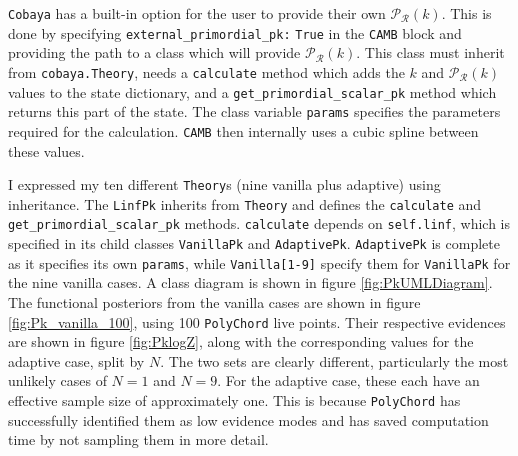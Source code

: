 \documentclass{article}
\begin{document}
\texttt{Cobaya} has a built-in option for the user to provide their own $\mathcal P_\mathcal R(k)$. This is done by specifying \texttt{external\_primordial\_pk:} \texttt{True} in the \texttt{CAMB} block and providing the path to a class which will provide $\mathcal P_\mathcal R(k)$. This class must inherit from \texttt{cobaya.Theory}, needs a \texttt{calculate} method which adds the $k$ and $\mathcal P_\mathcal R(k)$ values to the state dictionary, and a \texttt{get\_primordial\_scalar\_pk} method which returns this part of the state. The class variable \texttt{params} specifies the parameters required for the calculation. \texttt{CAMB} then internally uses a cubic spline between these values.

I expressed my ten different \texttt{Theory}s (nine vanilla plus adaptive) using inheritance. The \texttt{LinfPk} inherits from \texttt{Theory} and defines the \texttt{calculate} and \texttt{get\_primordial\_scalar\_pk} methods. \texttt{calculate} depends on \texttt{self.linf}, which is specified in its child classes \texttt{VanillaPk} and \texttt{AdaptivePk}. \texttt{AdaptivePk} is complete as it specifies its own \texttt{params}, while \texttt{Vanilla[1-9]} specify them for  \texttt{VanillaPk} for the nine vanilla cases. A class diagram is shown in figure \ref{fig:PkUMLDiagram}. The functional posteriors from the vanilla cases are shown in figure \ref{fig:Pk_vanilla_100}, using 100 \texttt{PolyChord} live points. Their respective evidences are shown in figure \ref{fig:PklogZ}, along with the corresponding values for the adaptive case, split by $N$. The two sets are clearly different, particularly the most unlikely cases of $N=1$ and $N=9$. For the adaptive case, these each have an effective sample size of approximately one. This is because \texttt{PolyChord} has successfully identified them as low evidence modes and has saved computation time by not sampling them in more detail.
\end{document}
